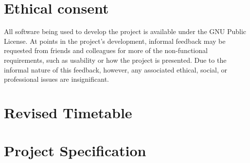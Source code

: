 \documentclass[10pt,a4paper]{article}
\begin{document}
\section{Ethical consent}
All software being used to develop the project is available under the GNU Public
License. At points in the project's development, informal feedback may be
requested from friends and colleagues for more of the non-functional
requirements, such as usability or how the project is presented. Due to the
informal nature of this feedback, however, any associated ethical, social, or
professional issues are insignificant.



\begin{appendices}

    \section{Revised Timetable}

    \section{Project Specification}

    

\end{appendices}
\end{document}
